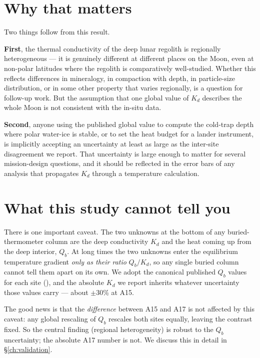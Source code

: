 \documentclass[11pt]{report}
\begin{document}
\section{Why that matters}

Two things follow from this result.

\textbf{First}, the thermal conductivity of the deep lunar regolith
is regionally heterogeneous --- it is genuinely different at
different places on the Moon, even at non-polar latitudes where the
regolith is comparatively well-studied. Whether this reflects
differences in mineralogy, in compaction with depth, in particle-size
distribution, or in some other property that varies regionally, is a
question for follow-up work. But the assumption that one global value
of $K_d$ describes the whole Moon is not consistent with the in-situ
data.

\textbf{Second}, anyone using the published global value to compute
the cold-trap depth where polar water-ice is stable, or to set the
heat budget for a lander instrument, is implicitly accepting an
uncertainty at least as large as the inter-site disagreement we
report. That uncertainty is large enough to matter for several
mission-design questions, and it should be reflected in the error
bars of any analysis that propagates $K_d$ through a temperature
calculation.

\section{What this study cannot tell you}

There is one important caveat. The two unknowns at the bottom of any
buried-thermometer column are the deep conductivity $K_d$ and the
heat coming up from the deep interior, $Q_b$. At long times the
two unknowns enter the equilibrium temperature gradient
\emph{only as their ratio} $Q_b/K_d$, so any single buried column
cannot tell them apart on its own. We adopt the canonical published
$Q_b$ values for each site (\citealt{langseth1976,nagihara2018}), and
the absolute $K_d$ we report inherits whatever uncertainty those
values carry --- about $\pm$30\% at A15.

The good news is that the \emph{difference} between A15 and A17 is
not affected by this caveat: any global rescaling of $Q_b$ rescales
both sites equally, leaving the contrast fixed. So the central
finding (regional heterogeneity) is robust to the $Q_b$ uncertainty;
the absolute A17 number is not. We discuss this in detail in
\S\ref{ch:validation}.
\end{document}
